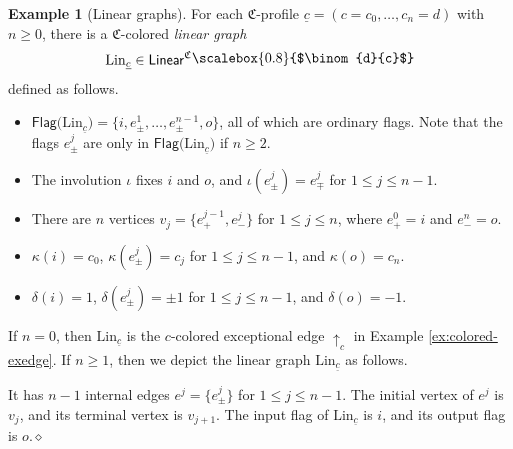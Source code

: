 \documentclass{amsbook}
\numberwithin{section}{chapter}
\numberwithin{subsection}{section}
\numberwithin{equation}{section}
\theoremstyle{plain}
\theoremstyle{definition}
\newtheorem{example}[equation]{Example}
\newcommand{\colorc}{\mathfrak{C}}
\newcommand{\Flag}{\mathsf{Flag}}
\newcommand{\Lin}{\mathrm{Lin}}
\newcommand{\dqed}{\hfill$\diamond$}
\newcommand{\Linear}{\mathsf{Linear}}
\newcommand{\Linearc}{\Linear^{\colorc}}
\newcommand{\uc}{\underline c}
\newcommand{\smallprof}[1]
{\raisebox{.05cm}{\scalebox{0.8}{#1}}}
\newcommand{\dc}{\smallprof{$\binom{d}{c}$}}
\begin{document}
\begin{example}[Linear graphs]\label{ex:linear-graph}
For each $\colorc$-profile $\uc=(c=c_0,\ldots,c_n=d)$ with $n \geq 0$, there is a $\colorc$-colored \emph{linear graph} \[\Lin_{\uc} \in \Linearc\dc\] defined as follows.
\begin{itemize}
\item $\Flag\bigl(\Lin_{\uc}\bigr) = \bigl\{i,e^1_{\pm},\ldots,e^{n-1}_{\pm},o\bigr\}$, all of which are ordinary flags.  Note that the flags $e^j_{\pm}$ are only in $\Flag\bigl(\Lin_{\uc}\bigr)$ if $n\geq 2$.
\item The involution $\iota$ fixes $i$ and $o$, and $\iota(e^j_{\pm})=e^j_{\mp}$ for $1\leq j \leq n-1$.
\item There are $n$ vertices $v_j = \{e^{j-1}_+,e^j_-\}$ for $1\leq j \leq n$, where $e^0_+=i$ and $e^n_-=o$.
\item $\kappa(i)=c_0$, $\kappa(e^j_{\pm}) = c_j$ for $1 \leq j \leq n-1$, and $\kappa(o)=c_n$.
\item $\delta(i)=1$, $\delta(e^j_{\pm})=\pm 1$ for $1 \leq j \leq n-1$, and $\delta(o)=-1$.
\end{itemize}
If $n=0$, then $\Lin_{\uc}$ is the $c$-colored exceptional edge $\uparrow_c$ in Example \ref{ex:colored-exedge}.  If $n \geq 1$, then we depict the linear graph $\Lin_{\uc}$ as follows.
\begin{center}\end{center}
It has $n-1$ internal edges $e^j=\{e^j_{\pm}\}$ for $1 \leq j \leq n-1$.  The initial vertex of $e^j$ is $v_j$, and its terminal vertex is $v_{j+1}$.  The input flag of $\Lin_{\uc}$ is $i$, and its output flag is $o$.\dqed
\end{example}
\end{document}
